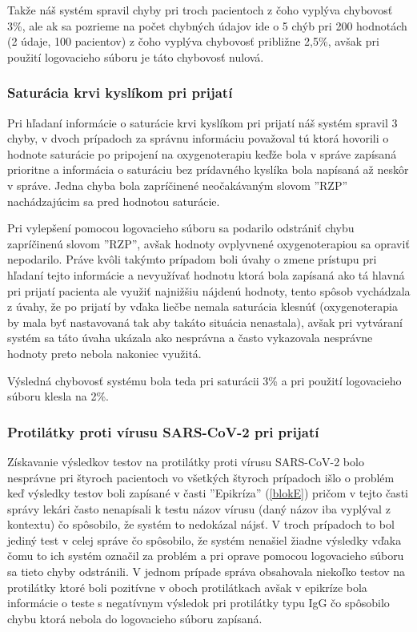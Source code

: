 Takže náš systém spravil chyby pri troch pacientoch z čoho vyplýva chybovosť 3\%, ale ak sa pozrieme na počet chybných údajov ide o 5 chýb pri 200 hodnotách (2 údaje, 100 pacientov) z čoho vyplýva chybovosť približne 2,5\%, avšak pri použití logovacieho súboru je táto chybovosť nulová.     

\subsubsection{Saturácia krvi kyslíkom pri prijatí}

Pri hľadaní informácie o saturácie krvi kyslíkom pri prijatí náš systém spravil 3 chyby, v dvoch prípadoch za správnu informáciu považoval tú ktorá hovorili o hodnote saturácie po pripojení na oxygenoterapiu keďže bola v správe zapísaná prioritne a informácia o saturáciu bez prídavného kyslíka bola napísaná až neskôr v správe. Jedna chyba bola zapríčinené neočakávaným slovom ''RZP'' nachádzajúcim sa pred hodnotou saturácie.

Pri vylepšení pomocou logovacieho súboru sa podarilo odstrániť chybu zapríčinenú slovom ''RZP'', avšak hodnoty ovplyvnené oxygenoterapiou sa opraviť nepodarilo. Práve kvôli takýmto prípadom boli úvahy o zmene prístupu pri hľadaní tejto informácie a nevyužívať hodnotu ktorá bola zapísaná ako tá hlavná pri prijatí pacienta ale využiť najnižšiu nájdenú hodnoty, tento spôsob vychádzala z úvahy, že po prijatí by vďaka liečbe nemala saturácia klesnúť (oxygenoterapia by mala byť nastavovaná tak aby takáto situácia nenastala), avšak pri vytváraní systém sa táto úvaha ukázala ako nesprávna a často vykazovala nesprávne hodnoty preto nebola nakoniec využitá.

Výsledná chybovosť systému bola teda pri saturácii 3\% a pri použití logovacieho súboru klesla na 2\%.

\subsubsection{Protilátky proti vírusu SARS-CoV-2 pri prijatí}

Získavanie výsledkov testov na protilátky proti vírusu SARS-CoV-2 bolo nesprávne pri štyroch pacientoch vo všetkých štyroch prípadoch išlo o problém keď výsledky testov boli zapísané v časti ''Epikríza'' (\ref{blokE}) pričom v tejto časti správy lekári často nenapísali k testu názov vírusu (daný názov iba vyplýval z kontextu) čo spôsobilo, že systém to nedokázal nájsť. V troch prípadoch to bol jediný test v celej správe čo spôsobilo, že systém nenašiel žiadne výsledky vďaka čomu to ich systém označil za problém a pri oprave pomocou logovacieho súboru sa tieto chyby odstránili. V jednom prípade správa obsahovala niekoľko testov na protilátky ktoré boli pozitívne v oboch protilátkach avšak v epikríze bola informácie o teste s negatívnym výsledok pri protilátky typu IgG čo spôsobilo chybu ktorá nebola do logovacieho súboru zapísaná.

